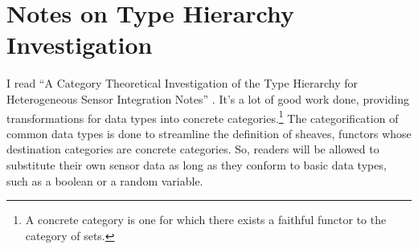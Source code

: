 \chapter{Notes on Type Hierarchy Investigation}

I read  ``A Category Theoretical Investigation of the Type Hierarchy for
Heterogeneous Sensor Integration Notes'' \cite{purvine2016category}. It's a lot
of good work done, providing transformations for data types into concrete
categories.\footnote{A concrete category is one for which there exists a
faithful functor to the category of sets.} The categorification of common data
types is done to streamline the definition of sheaves, functors whose
destination categories are concrete categories. So, readers will be allowed to
substitute their own sensor data as long as they conform to basic data types,
such as a boolean or a random variable.

